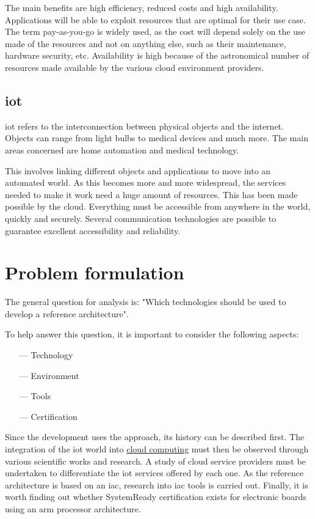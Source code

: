 The main benefits are high efficiency, reduced costs and high availability. Applications will be able to exploit resources that are optimal for their use case. The term pay-as-you-go is widely used, as the cost will depend solely on the use made of the resources and not on anything else, such as their maintenance, hardware security, etc. Availability is high because of the astronomical number of resources made available by the various \gls{cloud} environment providers.

\subsection{\acrlong{iot}}
\label{subsec:iot}
\acrfull{iot} refers to the interconnection between physical objects and the internet. Objects can range from light bulbs to medical devices and much more. The main areas concerned are home automation and medical technology.

This involves linking different objects and applications to move into an automated world. As this becomes more and more widespread, the services needed to make it work need a huge amount of resources. This has been made possible by the \gls{cloud}. Everything must be accessible from anywhere in the world, quickly and securely. Several communication technologies are possible to guarantee excellent accessibility and reliability.

\section{Problem formulation}

The general question for analysis is: "Which technologies should be used to develop a reference architecture".

To help answer this question, it is important to consider the following aspects:
\begin{itemize}
    \item[—] Technology
    \item[—] Environment
    \item[—] Tools
    \item[—] Certification
\end{itemize}
Since the development uses the  approach, its history can be described first. The integration of the \acrshort{iot} world into \hyperref[subsec:cloudcomputing]{cloud computing} must then be observed through various scientific works and research. A study of \gls{cloud} service providers must be undertaken to differentiate the iot services offered by each one. As the reference architecture is based on an \acrfull{iac}, research into \acrshort{iac} tools is carried out. Finally, it is worth finding out whether SystemReady certification exists for electronic boards using an \gls{arm} processor architecture.


